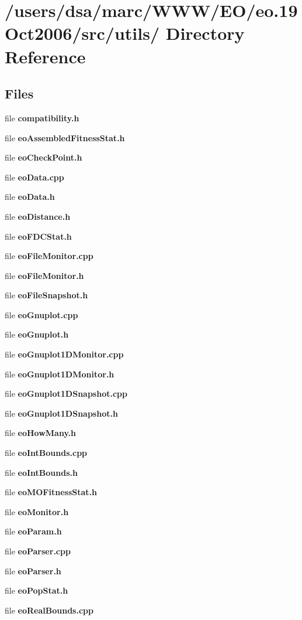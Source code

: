 \section{/users/dsa/marc/WWW/EO/eo.19Oct2006/src/utils/ Directory Reference}
\label{dir_000011}
\subsection*{Files}
\begin{CompactItemize}
\item 
file {\bf compatibility.h}
\item 
file {\bf eoAssembledFitnessStat.h}
\item 
file {\bf eoCheckPoint.h}
\item 
file {\bf eoData.cpp}
\item 
file {\bf eoData.h}
\item 
file {\bf eoDistance.h}
\item 
file {\bf eoFDCStat.h}
\item 
file {\bf eoFileMonitor.cpp}
\item 
file {\bf eoFileMonitor.h}
\item 
file {\bf eoFileSnapshot.h}
\item 
file {\bf eoGnuplot.cpp}
\item 
file {\bf eoGnuplot.h}
\item 
file {\bf eoGnuplot1DMonitor.cpp}
\item 
file {\bf eoGnuplot1DMonitor.h}
\item 
file {\bf eoGnuplot1DSnapshot.cpp}
\item 
file {\bf eoGnuplot1DSnapshot.h}
\item 
file {\bf eoHowMany.h}
\item 
file {\bf eoIntBounds.cpp}
\item 
file {\bf eoIntBounds.h}
\item 
file {\bf eoMOFitnessStat.h}
\item 
file {\bf eoMonitor.h}
\item 
file {\bf eoParam.h}
\item 
file {\bf eoParser.cpp}
\item 
file {\bf eoParser.h}
\item 
file {\bf eoPopStat.h}
\item 
file {\bf eoRealBounds.cpp}
\item 

\end{CompactItemize}
